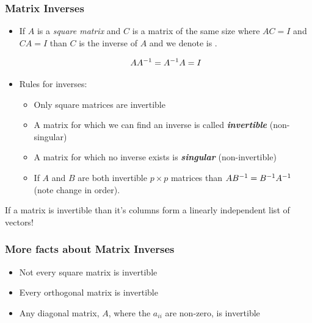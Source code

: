 \documentclass{beamer}
\begin{document}
\begin{frame}
  \frametitle{Matrix Inverses}

\begin{itemize}
\item If $A$ is a \emph{square matrix} and $C$ is a matrix of the same size where $AC = I$ and $CA=I$ than $C$ is the inverse of $A$ and we denote is .

\[
AA^{-1} = A^{-1}A = I
\]


\item Rules for inverses:

\begin{itemize}
 \item Only square matrices are invertible
 \item A matrix for which we can find an inverse is called \emph{\textbf{invertible}} (non-singular)
 \item A matrix for which no inverse exists is \emph{\textbf{singular}} (non-invertible)
 \item If $A$ and $B$ are both invertible $p \times p$ matrices than $AB^{-1} = B^{-1} A^{-1}$ (note change in order).
\end{itemize}
 
\end{itemize}

\begin{Highlight}
  If a matrix is invertible than it's columns form a linearly independent list of vectors!
\end{Highlight}

\end{frame}

\begin{frame}
  \frametitle{More facts about Matrix Inverses}

 \begin{itemize}
 \item Not every square matrix is invertible
 \item Every orthogonal matrix is invertible
 \item Any diagonal matrix, $A$, where the $a_{ii}$ are non-zero, is invertible
 \end{itemize}
 
\end{frame} 
\end{document}
